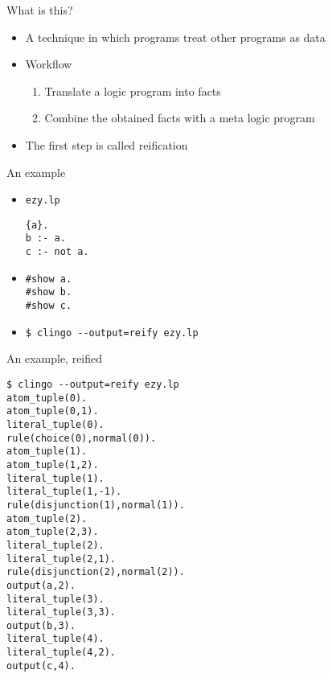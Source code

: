 \begin{frame}{What is this?}
  \bigskip
  \begin{itemize}
  \item A technique in which programs treat other programs as data
    \bigskip
  \item<2-> Workflow
    \begin{enumerate}
    \item Translate a logic program into facts
    \item Combine the obtained facts with a meta logic program
    \end{enumerate}
    \medskip
  \item<3-> The first step is called \alert{reification}
  \end{itemize}
\end{frame}
\begin{frame}[fragile]{An example}
  \begin{itemize}
  \item {} \texttt{ezy.lp}
\begin{lstlisting}
{a}.
b :- a.
c :- not a.
\end{lstlisting}
  \item<2-> 
\begin{lstlisting}
#show a.
#show b.
#show c.
\end{lstlisting}
  \item<3-> 
\begin{lstlisting}
$ clingo --output=reify ezy.lp
\end{lstlisting}
  \end{itemize}
\end{frame}
\begin{frame}[fragile,shrink=28]{An example, reified}
\bigskip
\begin{lstlisting}
$ clingo --output=reify ezy.lp
atom_tuple(0).
atom_tuple(0,1).
literal_tuple(0).
rule(choice(0),normal(0)).
atom_tuple(1).
atom_tuple(1,2).
literal_tuple(1).
literal_tuple(1,-1).
rule(disjunction(1),normal(1)).
atom_tuple(2).
atom_tuple(2,3).
literal_tuple(2).
literal_tuple(2,1).
rule(disjunction(2),normal(2)).
output(a,2).
literal_tuple(3).
literal_tuple(3,3).
output(b,3).
literal_tuple(4).
literal_tuple(4,2).
output(c,4).
\end{lstlisting}
\end{frame}
